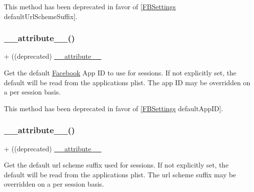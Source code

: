 This method has been deprecated in favor of \mbox{[}\hyperlink{interfaceFBSettings}{F\+B\+Settings} default\+Url\+Scheme\+Suffix\mbox{]}. \mbox{\label{interfaceFBSession_aab7b90337909b905920a4067b5253c2b}} 
\subsubsection{\texorpdfstring{\+\_\+\+\_\+attribute\+\_\+\+\_\+()}{\_\_attribute\_\_()}\hspace{0.1cm}{\footnotesize\ttfamily [20/25]}}
{\footnotesize\ttfamily + ((deprecated) \hyperlink{struct____attribute____}{\+\_\+\+\_\+attribute\+\_\+\+\_\+} \begin{DoxyParamCaption}{ }\end{DoxyParamCaption}}

Get the default \hyperlink{interfaceFacebook}{Facebook} App ID to use for sessions. If not explicitly set, the default will be read from the application\textquotesingle{}s plist. The app ID may be overridden on a per session basis.

This method has been deprecated in favor of \mbox{[}\hyperlink{interfaceFBSettings}{F\+B\+Settings} default\+App\+ID\mbox{]}. \mbox{\label{interfaceFBSession_aab7b90337909b905920a4067b5253c2b}} 
\subsubsection{\texorpdfstring{\+\_\+\+\_\+attribute\+\_\+\+\_\+()}{\_\_attribute\_\_()}\hspace{0.1cm}{\footnotesize\ttfamily [21/25]}}
{\footnotesize\ttfamily + ((deprecated) \hyperlink{struct____attribute____}{\+\_\+\+\_\+attribute\+\_\+\+\_\+} \begin{DoxyParamCaption}{ }\end{DoxyParamCaption}}

Get the default url scheme suffix used for sessions. If not explicitly set, the default will be read from the application\textquotesingle{}s plist. The url scheme suffix may be overridden on a per session basis.

